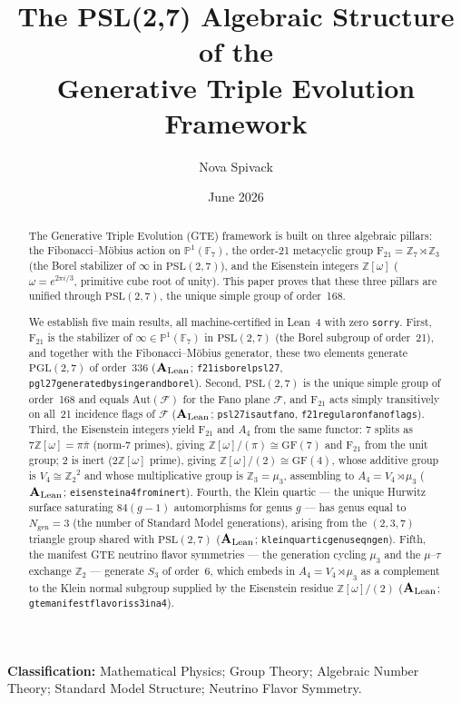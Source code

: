 \documentclass[11pt]{article}
\theoremstyle{remark}
\newcommand{\lean}[1]{%
  \penalty-100
  \begingroup\def\_{\textunderscore\allowbreak}\texttt{#1}\endgroup}
\newcommand{\Ngen}{\ensuremath{N_{\mathrm{gen}}}}
\newcommand{\PSLtwo}{\ensuremath{\mathrm{PSL}(2,7)}}
\newcommand{\PGLtwo}{\ensuremath{\mathrm{PGL}(2,7)}}
\newcommand{\FineSeven}{\ensuremath{\mathrm{F}_{21}}}
\newcommand{\Zcyc}[1]{\ensuremath{\mathbb{Z}_{#1}}}
\newcommand{\AltFour}{\ensuremath{A_4}}
\newcommand{\KleinFour}{\ensuremath{V_4}}
\newcommand{\Eisenstein}{\ensuremath{\mathbb{Z}[\omega]}}
\newcommand{\ProjLine}{\ensuremath{\mathbb{P}^1(\mathbb{F}_7)}}
\newcommand{\CatAL}{\ensuremath{\textbf{A}_{\rm Lean}}}
\begin{document}
\title{\textbf{The PSL(2,7) Algebraic Structure of the\\
Generative Triple Evolution Framework}}

\author{Nova Spivack}
\date{June 2026}
\maketitle

\NovaZenodoAfterTitle

\noindent\textbf{Classification:} Mathematical Physics; Group Theory; Algebraic Number Theory;
Standard Model Structure; Neutrino Flavor Symmetry.

\begin{abstract}
The Generative Triple Evolution (GTE) framework is built on three algebraic
pillars: the Fibonacci--Möbius action on $\ProjLine$, the order-21 metacyclic
group $\FineSeven = \Zcyc{7} \rtimes \Zcyc{3}$ (the Borel stabilizer of
$\infty$ in $\PSLtwo$), and the Eisenstein integers $\Eisenstein$
($\omega = e^{2\pi i/3}$, primitive cube root of unity).
This paper proves that these three pillars are unified through $\PSLtwo$,
the unique simple group of order~168.

We establish five main results, all machine-certified in Lean~4 with zero
\texttt{sorry}.
First, $\FineSeven$ is the stabilizer of $\infty \in \ProjLine$ in $\PSLtwo$
(the Borel subgroup of order~21), and together with the Fibonacci--Möbius
generator, these two elements generate $\PGLtwo$ of order~336
(\CatAL; \lean{f21\_is\_borel\_psl27}, \lean{pgl27\_generated\_by\_singer\_and\_borel}).
Second, $\PSLtwo$ is the unique simple group of order~168 and equals $\mathrm{Aut}(\mathcal{F})$
for the Fano plane $\mathcal{F}$, and $\FineSeven$ acts simply transitively on all~21
incidence flags of $\mathcal{F}$ (\CatAL; \lean{psl27\_is\_aut\_fano},
\lean{f21\_regular\_on\_fano\_flags}).
Third, the Eisenstein integers yield $\FineSeven$ and $\AltFour$ from the same
functor: $7$ splits as $7\Eisenstein = \pi\bar\pi$ (norm-7 primes), giving
$\Eisenstein/(\pi) \cong \mathrm{GF}(7)$ and $\FineSeven$ from the unit group;
$2$ is inert ($2\Eisenstein$ prime), giving $\Eisenstein/(2) \cong \mathrm{GF}(4)$,
whose additive group is $\KleinFour \cong \Zcyc{2}^2$ and whose multiplicative group
is $\Zcyc{3} = \mu_3$, assembling to $\AltFour = \KleinFour \rtimes \mu_3$
(\CatAL; \lean{eisenstein\_a4\_from\_inert\_2}).
Fourth, the Klein quartic — the unique Hurwitz surface saturating $84(g-1)$ automorphisms
for genus $g$ — has genus equal to $\Ngen = 3$ (the number of Standard Model generations),
arising from the $(2,3,7)$ triangle group shared with $\PSLtwo$
(\CatAL; \lean{klein\_quartic\_genus\_eq\_n\_gen}).
Fifth, the manifest GTE neutrino flavor symmetries — the generation cycling $\mu_3$
and the $\mu$--$\tau$ exchange $\Zcyc{2}$ — generate $S_3$ of order~6, which
embeds in $\AltFour = \KleinFour \rtimes \mu_3$ as a complement to the Klein normal
subgroup supplied by the Eisenstein residue $\Eisenstein/(2)$
(\CatAL; \lean{gte\_manifest\_flavor\_is\_s3\_in\_a4}).


\end{abstract}
\end{document}
